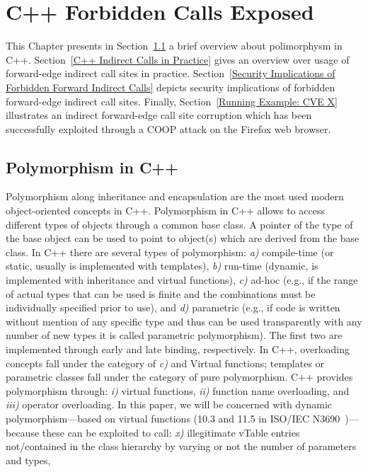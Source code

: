 \chapter{C++ Forbidden Calls Exposed}
\label{C++ Bad Forward Indirect Calls}
This Chapter presents in Section~\ref{Polymorphism in C++} 
a brief overview about polimorphysm in C++. 
Section~\ref{C++ Indirect Calls in Practice} gives an overview over
usage of forward-edge indirect call sites in practice.
Section~\ref{Security Implications of Forbidden Forward Indirect Calls}
depicts security implications of forbidden forward-edge indirect call sites.
Finally, Section~\ref{Running Example: CVE X} illustrates an indirect forward-edge 
call site corruption which has been successfully exploited 
through a COOP attack on the Firefox web browser.

\section{Polymorphism in C++}
\label{Polymorphism in C++}
Polymorphism along inheritance and encapsulation
are the most used modern object-oriented concepts
in C++. 
Polymorphism in C++ allows to access different types of objects 
through a common base class. A pointer of the type of the base object
can be used to point to object(s) which are derived from the base class.
In C++ there are several types of polymorphism:
\textit{a)} compile-time (or static, usually is implemented with templates), 
\textit{b)} run-time (dynamic, is implemented with inheritance and virtual functions), 
\textit{c)} ad-hoc (e.g., if the range of actual types that can be used 
is finite and the combinations must be individually specified prior to use), and
\textit{d)} parametric (e.g., if code is written without mention of any 
specific type and thus can be used transparently with any number of new types it
is called parametric polymorphism). 
The first two are implemented through early 
and late binding, respectively.
In C++, overloading concepts fall under the category of \textit{c)} and Virtual functions;
templates or parametric classes fall under the category of pure polymorphism.
C++ provides polymorphism through: 
\textit{i)} virtual functions,
\textit{ii)} function name overloading, and 
\textit{iii)} operator overloading. 
In this paper, we will be concerned with dynamic 
polymorphism---based on virtual functions (10.3 and 11.5 in 
ISO/IEC N3690~\cite{iso:iecN3690})---because these can be exploited to 
call: 
\textit{x)} illegitimate vTable entries not/contained in the 
class hierarchy by varying or not the number of parameters and types,

